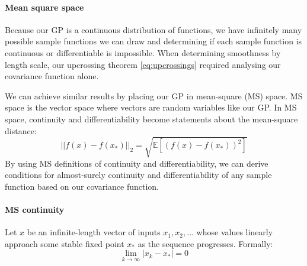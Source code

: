 \paragraph{Mean square space}
Because our GP is a continuous distribution of functions, we have infinitely many possible sample functions we can draw and determining if each sample function is continuous or differentiable is impossible. When determining smoothness by length scale, our upcrossing theorem \ref{eq:upcrossings} required analysing our covariance function alone. 

We can achieve similar results by placing our GP in mean-square (MS) space. MS space is the vector space where vectors are random variables like our GP. In MS space, continuity and differentiability become statements about the mean-square distance:
\begin{equation*}
    || f(x) - f(x_*) ||_2 = \sqrt{\mathbb{E}[(f(x) - f(x_*))^2]}
\end{equation*}
By using MS definitions of continuity and differentiability, we can derive conditions for almost-surely continuity and differentiability of any sample function based on our covariance function.



\paragraph{MS continuity}
Let $x$ be an infinite-length vector of inputs $x_1, x_2, ...$ whose values linearly approach some stable fixed point $x_*$ as the sequence progresses. Formally:
\begin{equation*}
    \lim_{k \to \infty} |x_k - x_*| = 0
\end{equation*}

